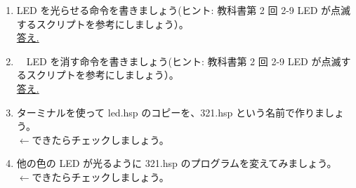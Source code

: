 \begin{tcolorbox}[title=\useOmetoi]
\begin{enumerate}
\item LED を光らせる命令を書きましょう(ヒント: 教科書第 2 回 2-9 LED が点滅するスクリプトを参考にしましょう）。\\
\underline{答え.\hspace{0.8\linewidth}}
\item　LED を消す命令を書きましょう(ヒント: 教科書第 2 回 2-9 LED が点滅するスクリプトを参考にしましょう）。\\
\underline{答え.\hspace{0.8\linewidth}}
\item ターミナルを使って led.hsp のコピーを、321.hsp という名前で作りましょう。\\
\fbox{\phantom{白}} $\leftarrow$できたらチェックしましょう。
\item 他の色の LED が光るように 321.hsp のプログラムを変えてみましょう。\\
\fbox{\phantom{白}} $\leftarrow$できたらチェックしましょう。
\end{enumerate}
\end{tcolorbox}

